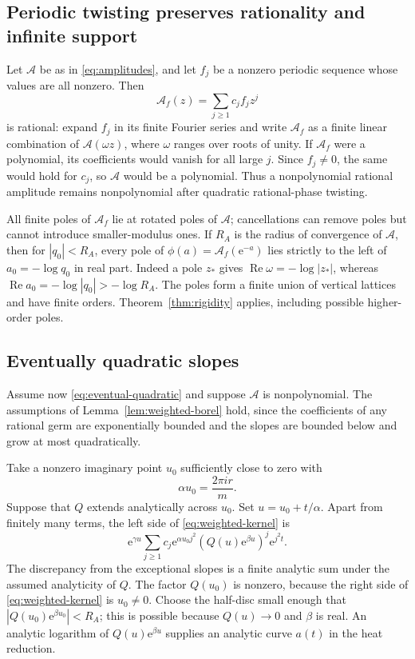 \documentclass[11pt,a4paper]{article}
\numberwithin{equation}{section}
\theoremstyle{definition}
\theoremstyle{remark}
\newcommand{\ee}{\mathrm e}
\newcommand{\Ree}{\operatorname{Re}}
\newcommand{\rationalamp}{\mathcal A}
\begin{document}
\subsection{Periodic twisting preserves rationality and infinite support}
Let $\rationalamp$ be as in \eqref{eq:amplitudes}, and let $f_j$ be a
nonzero periodic sequence whose values are all nonzero.  Then
\begin{equation}
 \rationalamp_f(z)=\sum_{j\ge1}c_jf_jz^j
 \label{eq:twisted-amplitude}
\end{equation}
is rational: expand $f_j$ in its finite Fourier series and write
$\rationalamp_f$ as a finite linear combination of
$\rationalamp(\omega z)$, where $\omega$ ranges over roots of unity.
If $\rationalamp_f$ were a polynomial, its coefficients would vanish
for all large $j$.  Since $f_j\ne0$, the same would hold for $c_j$,
so $\rationalamp$ would be a polynomial.  Thus a nonpolynomial rational
amplitude remains nonpolynomial after quadratic rational-phase twisting.

All finite poles of $\rationalamp_f$ lie at rotated poles of
$\rationalamp$; cancellations can remove poles but cannot introduce
smaller-modulus ones.  If $R_A$ is the radius of convergence of
$\rationalamp$, then for $|q_0|<R_A$, every pole of
$\phi(a)=\rationalamp_f(\ee^{-a})$ lies strictly to the left of
$a_0=-\log q_0$ in real part.  Indeed a pole $z_*$ gives
$\Ree\omega=-\log|z_*|$, whereas
$\Ree a_0=-\log|q_0|>-\log R_A$.
The poles form a finite union of vertical lattices and have finite orders.
Theorem~\ref{thm:rigidity} applies, including possible higher-order poles.

\subsection{Eventually quadratic slopes}
Assume now \eqref{eq:eventual-quadratic} and suppose
$\rationalamp$ is nonpolynomial.  The assumptions of
Lemma~\ref{lem:weighted-borel} hold, since the coefficients of any
rational germ are exponentially bounded and the slopes are bounded
below and grow at most quadratically.

Take a nonzero imaginary point $u_0$ sufficiently close to zero with
\begin{equation}
 \alpha u_0=\frac{2\pi i r}{m}.
 \label{eq:scaled-rational-time}
\end{equation}
Suppose that $Q$ extends analytically across $u_0$.  Set
$u=u_0+t/\alpha$.  Apart from finitely many terms, the left side of
\eqref{eq:weighted-kernel} is
\begin{equation}
 \ee^{\gamma u}\sum_{j\ge1}c_j
      \ee^{\alpha u_0j^2}
      \left(Q(u)\ee^{\beta u}\right)^j\ee^{j^2t}.
 \label{eq:weighted-heat-reduction}
\end{equation}
The discrepancy from the exceptional slopes is a finite analytic sum
under the assumed analyticity of $Q$.
The factor $Q(u_0)$ is nonzero, because the right side of
\eqref{eq:weighted-kernel} is $u_0\ne0$.
Choose the half-disc small enough that
$|Q(u_0)\ee^{\beta u_0}|<R_A$; this is possible because
$Q(u)\to0$ and $\beta$ is real.
An analytic logarithm of $Q(u)\ee^{\beta u}$ supplies an analytic curve
$a(t)$ in the heat reduction.
\end{document}
